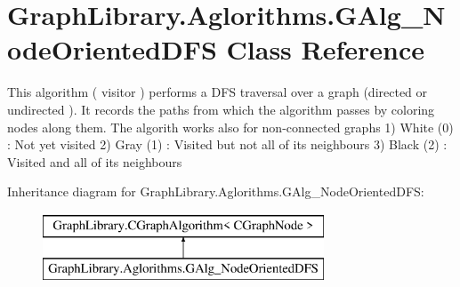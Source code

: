 \hypertarget{class_graph_library_1_1_aglorithms_1_1_g_alg___node_oriented_d_f_s}{}\section{Graph\+Library.\+Aglorithms.\+G\+Alg\+\_\+\+Node\+Oriented\+D\+F\+S Class Reference}
\label{class_graph_library_1_1_aglorithms_1_1_g_alg___node_oriented_d_f_s}


This algorithm ( visitor ) performs a D\+F\+S traversal over a graph (directed or undirected ). It records the paths from which the algorithm passes by coloring nodes along them. The algorith works also for non-\/connected graphs 1) White (0) \+: Not yet visited 2) Gray (1) \+: Visited but not all of its neighbours 3) Black (2) \+: Visited and all of its neighbours  


Inheritance diagram for Graph\+Library.\+Aglorithms.\+G\+Alg\+\_\+\+Node\+Oriented\+D\+F\+S\+:\begin{figure}[H]
\begin{center}
\leavevmode
\includegraphics[height=2.000000cm]{class_graph_library_1_1_aglorithms_1_1_g_alg___node_oriented_d_f_s}
\end{center}
\end{figure}
